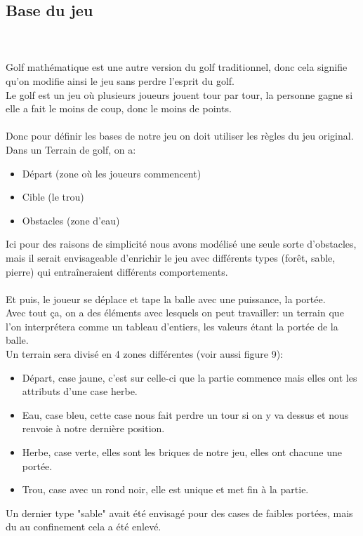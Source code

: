 \documentclass{article}
\begin{document}
\subsection{Base du jeu}
~\\~\\
Golf mathématique est une autre version du golf traditionnel, donc cela signifie qu'on modifie ainsi le jeu sans perdre l'esprit du golf.\\
Le golf est un jeu où plusieurs joueurs jouent tour par tour, la personne gagne si elle a fait le moins de coup, donc le moins de points.\\~\\
Donc pour définir les bases de notre jeu on doit utiliser les règles du jeu original.
Dans un Terrain de golf, on a:
\begin{itemize}
\item Départ (zone où les joueurs commencent)
\item Cible (le trou)
\item Obstacles (zone d'eau)
\end{itemize}
Ici pour des raisons de simplicité nous avons modélisé une seule sorte d'obstacles, mais il serait envisageable d'enrichir le jeu avec différents types (forêt, sable, pierre) qui entraîneraient différents comportements.
\\~\\
Et puis, le joueur se déplace et tape la balle avec une puissance, la portée.\\
Avec tout ça, on a des éléments avec lesquels on peut travailler: un terrain que l'on interprétera comme un tableau d'entiers, les valeurs étant la portée de la balle.\\
Un terrain sera divisé en 4 zones différentes (voir aussi figure 9):
\begin{itemize}
\item Départ, case jaune, c'est sur celle-ci que la partie commence mais elles ont les attributs d'une case herbe.
\item Eau, case bleu, cette case nous fait perdre un tour si on y va dessus et nous renvoie à notre dernière position.
\item Herbe, case verte, elles sont les briques de notre jeu, elles ont chacune une portée.
\item Trou, case avec un rond noir, elle est unique et met fin à la partie.
\end{itemize}
Un dernier type "sable" avait été envisagé pour des cases de faibles portées, mais du au confinement cela a été enlevé.
\newpage
\end{document}
